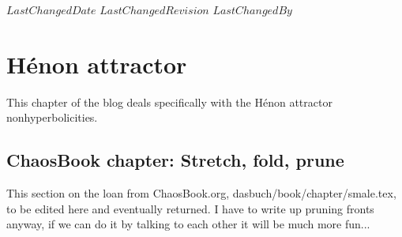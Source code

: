 \ifsvnmulti
 {$LastChangedDate$}
 {$LastChangedRevision$} {$LastChangedBy$}
\fi

\chapter{H\'enon  attractor}
\label{c-Henon}

This chapter of the blog deals specifically with the
H\'enon attractor nonhyperbolicities.

\section{ChaosBook chapter: Stretch, fold, prune}
\label{c-smale}



\noindent
This section on the loan from ChaosBook.org,
dasbuch/book/chapter/smale.tex, to be edited here and eventually
returned. I have to write up pruning fronts anyway, if we can do it by
talking to each other it will be much more fun...

\Remarks

